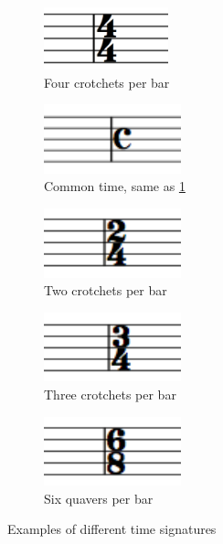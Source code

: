 \begin{figure}[h!]
    \centering
    \begin{subfigure}[b]{.45\linewidth}
        \centering
        \includegraphics[height=1.8cm]{gfx/music-theory/time-signature-4-4.png}
        \caption{Four crotchets per bar}
        \label{fig:time-signature-4-4}
    \end{subfigure}
    \begin{subfigure}[b]{.45\linewidth}
        \centering
        \includegraphics[height=2cm]{gfx/music-theory/time-signature-common.png}
        \caption{Common time, same as \cref{fig:time-signature-4-4}}
    \end{subfigure}
    
    \begin{subfigure}[b]{.3\linewidth}
        \centering
        \includegraphics[height=2cm]{gfx/music-theory/time-signature-2-4.png}
        \caption{Two crotchets per bar}
    \end{subfigure}
    \begin{subfigure}[b]{.3\linewidth}
        \centering
        \includegraphics[height=2cm]{gfx/music-theory/time-signature-3-4.png}
        \caption{Three crotchets per bar}
    \end{subfigure}
    \begin{subfigure}[b]{.3\linewidth}
        \centering
        \includegraphics[height=2cm]{gfx/music-theory/time-signature-6-8.png}
        \caption{Six quavers per bar}
    \end{subfigure}

    \caption{Examples of different time signatures}
\end{figure}

